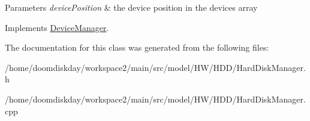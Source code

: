 \begin{DoxyParams}{Parameters}
{\em device\+Position} & the device position in the devices array \\
\hline
\end{DoxyParams}


Implements \hyperlink{classDeviceManager_ae367c6847b2988cf6249cbf6254261cb}{Device\+Manager}.



The documentation for this class was generated from the following files\+:\begin{DoxyCompactItemize}
\item 
/home/doomdiskday/workspace2/main/src/model/\+H\+W/\+H\+D\+D/Hard\+Disk\+Manager.\+h\item 
/home/doomdiskday/workspace2/main/src/model/\+H\+W/\+H\+D\+D/Hard\+Disk\+Manager.\+cpp\end{DoxyCompactItemize}

